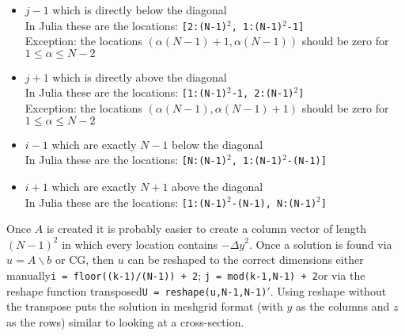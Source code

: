 \documentclass[10pt]{article}
\begin{document}
	\begin{itemize}
		\item $ j-1 $ which is directly below the diagonal\\
		In Julia these are the locations: \texttt{[2:(N-1)$^2$, 1:(N-1)$^2$-1]}\\
		Exception: the locations $ (\alpha(N-1) + 1,\alpha(N-1)) $ should be zero for $ 1\leq\alpha\leq N-2 $ 
		\item $ j+1 $ which is directly above the diagonal\\
		In Julia these are the locations: \texttt{[1:(N-1)$^2$-1, 2:(N-1)$^2$]}\\
		Exception: the locations $ (\alpha(N-1),\alpha(N-1)+1) $ should be zero for $ 1\leq\alpha\leq N-2 $ 
		\item $ i-1 $ which are exactly $ N-1 $ below the diagonal\\
		In Julia these are the locations: \texttt{[N:(N-1)$^2$, 1:(N-1)$^2$-(N-1)]}
		\item $ i+1 $ which are exactly $ N+1 $ above the diagonal\\
		In Julia these are the locations: \texttt{[1:(N-1)$^2$-(N-1), N:(N-1)$^2$]}
	\end{itemize}
	Once $ A $ is created it is probably easier to create a column vector of length $ (N-1)^2 $ in which every location contains $ -{\Delta y}^2 $. Once a solution is found via $ u = A\backslash b $ or CG, then $ u $ can be reshaped to the correct dimensions either manually\textemdash \texttt{i = floor((k-1)/(N-1)) + 2}; \texttt{j = mod(k-1,N-1) + 2}\textemdash or via the reshape function transposed\textemdash \texttt{U = reshape(u,N-1,N-1)$'$}. Using reshape without the transpose puts the solution in meshgrid format (with $ y $ as the columns and $ z $ as the rows) similar to looking at a cross-section.
	
\end{document}
